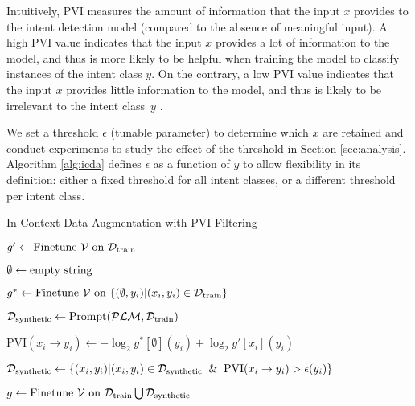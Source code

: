 \documentclass[11pt]{article}
\begin{document}
Intuitively, PVI measures the amount of information that the input $x$ provides to the intent detection model (compared to the absence of meaningful input).
A high PVI value indicates that the input $x$  provides a lot of information to the model, and thus is more likely to be helpful when training the model to classify instances of the intent class $y$. 
On the contrary, a low PVI value indicates that the input $x$ provides little information to the model, and thus is likely to be irrelevant to the intent \mbox{class $y$} \cite{DBLP:conf/icml/EthayarajhCS22}. 

We set a threshold $\epsilon$ (tunable parameter) to determine which $x$ are retained and conduct experiments to study the effect of the threshold in Section \ref{sec:analysis}. Algorithm \ref{alg:icda} defines $\epsilon$ as a function of $y$ to allow flexibility in its definition: either a fixed threshold for all intent classes, or a different threshold per intent class.

\begin{algorithm}[t]
\caption{In-Context Data Augmentation with PVI Filtering}
\label{alg:icda}
\DontPrintSemicolon
  
  $g' \gets \textnormal{Finetune } \mathcal{V} \textnormal{ on } \mathcal{D}_{\textnormal{train}} $
  
  $\emptyset \gets \textnormal{empty string}$
  
  
  $g^* \gets \textnormal{Finetune } \mathcal{V} \textnormal{ on } \{ (\emptyset, y_i) | (x_i, y_i) \in  \mathcal{D}_{\textnormal{train}} \}$
  
  $\mathcal{D}_{\textnormal{synthetic}} \gets \mathrm{Prompt}( \mathcal{PLM}, \mathcal{D}_{\textnormal{train}} )$
  
  
  { 
    $\mathrm{PVI}(x_i \to y_i) \gets - \log_2 g^*[\emptyset](y_i) + \log_2 g'[x_i](y_i)$
  }
  
  $\mathcal{D}_{\textnormal{synthetic}} \gets
  \{
    (x_i, y_i) | (x_i, y_i) \in  \mathcal{D}_{\textnormal{synthetic}} 
    \And \mathrm{PVI}(x_i \to y_i) > \epsilon(y_i)
  \}$
  
  $g \gets \textnormal{Finetune } \mathcal{V} \textnormal{ on } \mathcal{D}_{\textnormal{train}} \bigcup \mathcal{D}_{\textnormal{synthetic} }$
\end{algorithm}
\end{document}
